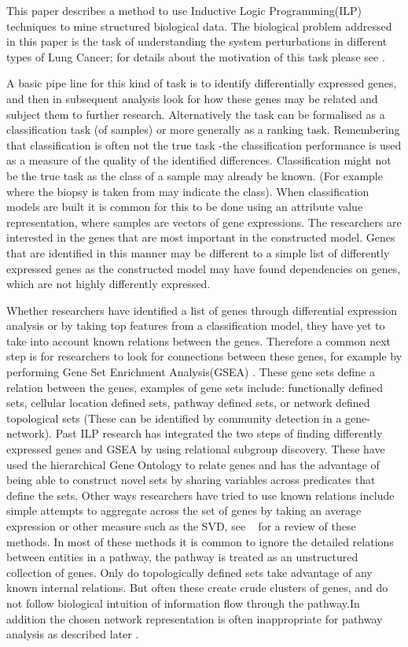 \documentclass[runningheads,a4paper]{llncs}
\begin{document}
This paper describes a method to use Inductive Logic Programming(ILP) techniques to mine structured biological data. The biological problem addressed in this paper is the task of  understanding the system perturbations in different types of Lung Cancer; for details about the motivation of this task please see \citep{rhrissorrakrai_sbv_2013}.

A basic pipe line for this kind of task is to identify differentially expressed genes, and then in subsequent analysis look for how these genes may be related and subject them to further research.  Alternatively the task can be formalised as a classification task (of samples) or more generally as a ranking task. Remembering that classification is often not the true task -the classification performance is used as a measure of the quality of the identified differences. Classification might not be the true task as the class of a sample may already be known. (For example where the biopsy is taken from may indicate the class). When classification models are built it is common for this to be done using an attribute value representation, where samples are vectors of gene expressions. The researchers are interested in the genes that are most important in the constructed model. Genes that are identified in this manner may be  different to a simple list of differently expressed genes as the constructed model may have found dependencies on genes, which are not highly differently expressed. 

Whether researchers have identified a list of genes through differential expression analysis or by taking top features from a classification model, they have yet to take into account known relations between the genes. Therefore  a common next step is for researchers to look for connections between these genes, for example by performing Gene Set Enrichment Analysis(GSEA) \citep{subramanian_gene_2005}. These gene sets define a relation between the genes,  examples of gene sets include: functionally defined sets, cellular location defined sets, pathway defined sets, or network defined topological sets (These can be identified by community detection in a gene-network).
Past ILP research \citep{gamberger_induction_2004} has integrated the two steps of finding differently expressed genes and GSEA by using relational subgroup discovery. These have used the hierarchical Gene Ontology to relate genes and has the advantage of being able to construct novel sets by sharing variables across predicates that define the sets. Other ways researchers have tried to use known relations include simple attempts to aggregate across the set of genes by taking an average expression or other measure such as the SVD, see ~\citep{holec_comparative_2012} for a review of these methods.  In most of these methods it is common to ignore the detailed relations between entities in a pathway, the pathway is treated as an unstructured collection of genes. Only do topologically defined sets take advantage of any known internal relations. But often these create crude clusters of genes, and do not follow biological intuition of information flow through the pathway.In addition the chosen network representation is often inappropriate for pathway analysis as described later .
\end{document}
